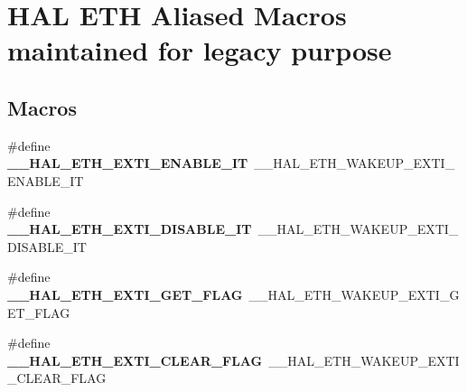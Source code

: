 \hypertarget{group___h_a_l___e_t_h___aliased___macros}{\section{H\-A\-L E\-T\-H Aliased Macros maintained for legacy purpose}
\label{group___h_a_l___e_t_h___aliased___macros}
}
\subsection*{Macros}
\begin{DoxyCompactItemize}
\item 
\hypertarget{group___h_a_l___e_t_h___aliased___macros_gad96bacd190bd8ba2523e83be7b1432d8}{\#define {\bfseries \-\_\-\-\_\-\-H\-A\-L\-\_\-\-E\-T\-H\-\_\-\-E\-X\-T\-I\-\_\-\-E\-N\-A\-B\-L\-E\-\_\-\-I\-T}~\-\_\-\-\_\-\-H\-A\-L\-\_\-\-E\-T\-H\-\_\-\-W\-A\-K\-E\-U\-P\-\_\-\-E\-X\-T\-I\-\_\-\-E\-N\-A\-B\-L\-E\-\_\-\-I\-T}\label{group___h_a_l___e_t_h___aliased___macros_gad96bacd190bd8ba2523e83be7b1432d8}

\item 
\hypertarget{group___h_a_l___e_t_h___aliased___macros_ga2e18c5d21291947835cdefeecdd061ec}{\#define {\bfseries \-\_\-\-\_\-\-H\-A\-L\-\_\-\-E\-T\-H\-\_\-\-E\-X\-T\-I\-\_\-\-D\-I\-S\-A\-B\-L\-E\-\_\-\-I\-T}~\-\_\-\-\_\-\-H\-A\-L\-\_\-\-E\-T\-H\-\_\-\-W\-A\-K\-E\-U\-P\-\_\-\-E\-X\-T\-I\-\_\-\-D\-I\-S\-A\-B\-L\-E\-\_\-\-I\-T}\label{group___h_a_l___e_t_h___aliased___macros_ga2e18c5d21291947835cdefeecdd061ec}

\item 
\hypertarget{group___h_a_l___e_t_h___aliased___macros_gab8cb753cb998d6d2d65f2ce0bee7c384}{\#define {\bfseries \-\_\-\-\_\-\-H\-A\-L\-\_\-\-E\-T\-H\-\_\-\-E\-X\-T\-I\-\_\-\-G\-E\-T\-\_\-\-F\-L\-A\-G}~\-\_\-\-\_\-\-H\-A\-L\-\_\-\-E\-T\-H\-\_\-\-W\-A\-K\-E\-U\-P\-\_\-\-E\-X\-T\-I\-\_\-\-G\-E\-T\-\_\-\-F\-L\-A\-G}\label{group___h_a_l___e_t_h___aliased___macros_gab8cb753cb998d6d2d65f2ce0bee7c384}

\item 
\hypertarget{group___h_a_l___e_t_h___aliased___macros_ga54ff39d1814de51ec16312fb209f2f41}{\#define {\bfseries \-\_\-\-\_\-\-H\-A\-L\-\_\-\-E\-T\-H\-\_\-\-E\-X\-T\-I\-\_\-\-C\-L\-E\-A\-R\-\_\-\-F\-L\-A\-G}~\-\_\-\-\_\-\-H\-A\-L\-\_\-\-E\-T\-H\-\_\-\-W\-A\-K\-E\-U\-P\-\_\-\-E\-X\-T\-I\-\_\-\-C\-L\-E\-A\-R\-\_\-\-F\-L\-A\-G}\label{group___h_a_l___e_t_h___aliased___macros_ga54ff39d1814de51ec16312fb209f2f41}


\end{DoxyCompactItemize}
